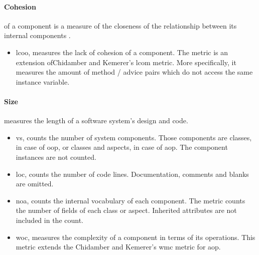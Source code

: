 \paragraph{Cohesion}of a component is a measure of the closeness of the relationship between its internal components \cite{sommerville2004software}.
	\begin{itemize}
		\item \ac{lcoo}, measures the lack of cohesion of a component.
		The metric is an extension ofChidamber and Kemerer's \cite{chidamber1994metrics} \ac{lcom} metric.
		More specifically, it measures the amount of method / advice pairs which do not access the same instance variable.
	\end{itemize}

\paragraph{Size}measures the length of a software system's design and code.
	\begin{itemize}
		\item \ac{vs}, counts the number of system components.
		Those components are classes, in case of \ac{oop}, or classes and aspects, in case of \ac{aop}.
		The component instances are not counted.

		\item \ac{loc}, counts the number of code lines.
		Documentation, comments and blanks are omitted.

		\item \ac{noa}, counts the internal vocabulary of each component.
		The metric counts the number of fields of each class or aspect.
		Inherited attributes are not included in the count.

		\item \ac{woc}, measures the complexity of a component in terms of its operations.
		This metric extends the Chidamber and Kemerer's \cite{chidamber1994metrics} \ac{wmc} metric for \ac{aop}.
	\end{itemize}


